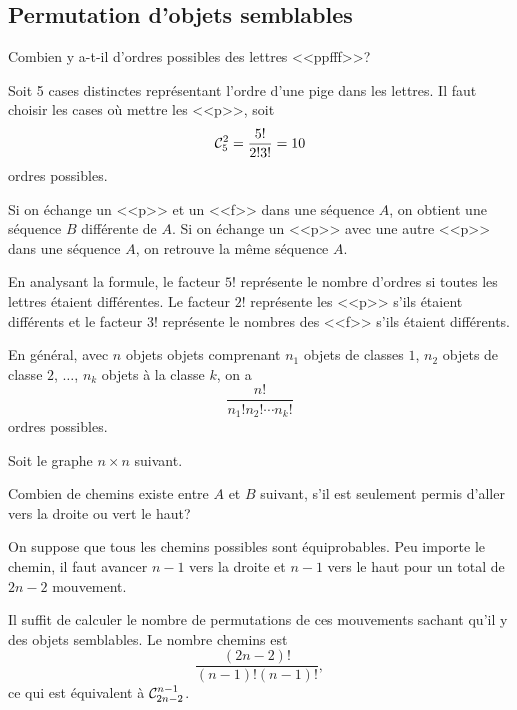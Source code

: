 \documentclass[11pt]{article}
\newcommand\comb[2]{%
	\ensuremath{%
		\mathcal{C}_{#2}^{#1}%
	}%
}%
\theoremstyle{remark}
\theoremstyle{definition}
\begin{document}
\subsection{Permutation d'objets semblables}
\begin{exemple}
	Combien y a-t-il d'ordres possibles des lettres <<ppfff>>?

	Soit 5 cases distinctes représentant l'ordre d'une pige dans les lettres.
	Il faut choisir les cases où mettre les <<p>>, soit
	\begin{equation*}
		\comb{2}{5}=\frac{5!}{2!3!}=10
	\end{equation*}
	ordres possibles.
	
	Si on échange un <<p>> et un <<f>> dans une séquence $A$, on obtient une
	séquence $B$ différente de $A$. Si on échange un <<p>> avec une autre <<p>>
	dans une séquence $A$, on retrouve la même séquence $A$.

	En analysant la formule, le facteur $5!$ représente le nombre d'ordres si
	toutes les lettres étaient différentes. Le facteur $2!$ représente les
	<<p>> s'ils étaient différents et le facteur $3!$ représente le nombres des
	<<f>> s'ils étaient différents.
\end{exemple}

En général, avec $n$ objets objets comprenant $n_1$ objets de classes $1$,
$n_2$ objets de classe $2$, $\dots$, $n_k$ objets à la classe $k$, on a
\begin{equation*}
	\frac{n!}{n_1!n_2!\cdots n_k!}
\end{equation*}
ordres possibles.

\begin{exemple}\label{ex:network}
	Soit le graphe $n\times n$ suivant.
	\begin{figure}[H]
		\vspace{-3mm}
		\centering
		
		\vspace{-3mm}
	\end{figure}

	Combien de chemins existe entre $A$ et $B$ suivant, s'il est seulement
	permis d'aller vers la droite ou vert le haut?
\end{exemple}
\addtocounter{exemple}{-1}
\begin{exemple}[suite]
	On suppose que tous les chemins possibles sont équiprobables. Peu importe
	le chemin, il faut avancer $n-1$ vers la droite et $n-1$ vers le haut pour
	un total de $2n-2$ mouvement.
	
	Il suffit de calculer le nombre de permutations de ces mouvements sachant
	qu'il y des objets semblables. Le nombre chemins est
	\begin{equation*}
		\frac{\left(2n-2\right)!}{\left(n-1\right)!\left(n-1\right)!},
	\end{equation*}
	ce qui est équivalent à $\comb{n-1}{2n-2}$.
\end{exemple}
\end{document}
